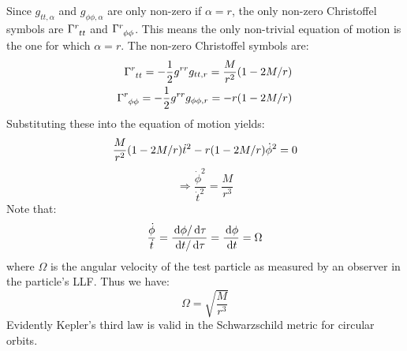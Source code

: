Since $g_{tt,\alpha}$ and $g_{\phi\phi,\alpha}$ are only non-zero if $\alpha = r$, the only non-zero Christoffel symbols are $\Gamma\indices{^r_{tt}}$ and $\Gamma\indices{^r_{\phi\phi}}$. This means the only non-trivial equation of motion is the one for which $\alpha = r$. The non-zero Christoffel symbols are:
\begin{subequations}
\begin{align}
\Gamma\indices{^r_{tt}} = -\frac{1}{2} g^{rr}g_{tt,r} = \frac{M}{r^2}(1 - 2M/r) \\
\Gamma\indices{^r_{\phi\phi}} = -\frac{1}{2} g^{rr}g_{\phi\phi,r} = -r(1-2M/r)
\end{align}
\end{subequations}
Substituting these into the equation of motion yields:
\begin{equation*}
\frac{M}{r^2}(1 - 2M/r)\dot{t}^2 - r(1-2M/r)\dot{\phi}^2 = 0 \\
\end{equation*}
\begin{equation*}
\Rightarrow \frac{\dot{\phi}^2}{\dot{t}^2} = \frac{M}{r^3}
\end{equation*}
Note that:
\begin{equation}
\frac{\dot{\phi}}{\dot{t}} = \frac{\,\mathrm{d}\phi/\,\mathrm{d}\tau}{\,\mathrm{d} t/\,\mathrm{d}\tau} = \frac{\,\mathrm{d}\phi}{\,\mathrm{d} t} = \Omega
\end{equation}
where $\Omega$ is the angular velocity of the test particle as measured by an observer in the particle's \ac{LLF}. Thus we have:
\begin{equation}
\label{eqn:relativistic_kepler}
\Omega = \sqrt{\frac{M}{r^3}}
\end{equation}
Evidently Kepler's third law is valid in the Schwarzschild metric for circular orbits. 

